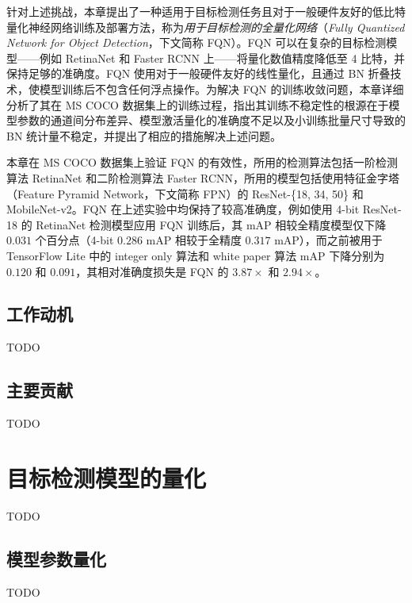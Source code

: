 针对上述挑战，本章提出了一种适用于目标检测任务且对于一般硬件友好的低比特量化神经网络训练及部署方法，称为\emph{用于目标检测的全量化网络}（\emph{Fully Quantized Network for Object Detection}，下文简称 FQN）。FQN 可以在复杂的目标检测模型——例如 RetinaNet 和 Faster RCNN 上——将量化数值精度降低至 4 比特，并保持足够的准确度。FQN 使用对于一般硬件友好的线性量化，且通过 BN 折叠技术，使模型训练后不包含任何浮点操作。为解决 FQN 的训练收敛问题，本章详细分析了其在 MS COCO 数据集上的训练过程，指出其训练不稳定性的根源在于模型参数的通道间分布差异、模型激活量化的准确度不足以及小训练批量尺寸导致的 BN 统计量不稳定，并提出了相应的措施解决上述问题。

本章在 MS COCO 数据集上验证 FQN 的有效性，所用的检测算法包括一阶检测算法 RetinaNet 和二阶检测算法 Faster RCNN，所用的模型包括使用特征金字塔（Feature Pyramid Network，下文简称 FPN）的 ResNet-\{18, 34, 50\} 和 MobileNet-v2。FQN 在上述实验中均保持了较高准确度，例如使用 4-bit ResNet-18 的 RetinaNet 检测模型应用 FQN 训练后，其 mAP 相较全精度模型仅下降 $0.031$ 个百分点（4-bit $0.286$ mAP 相较于全精度 $0.317$ mAP），而之前被用于 TensorFlow Lite 中的 integer only 算法和 white paper 算法 mAP 下降分别为 $0.120$ 和 $0.091$，其相对准确度损失是 FQN 的 $3.87\times$ 和 $2.94\times$。
\subsection{工作动机}
TODO
\subsection{主要贡献}
TODO

\section{目标检测模型的量化}
TODO
\subsection{模型参数量化}
TODO
